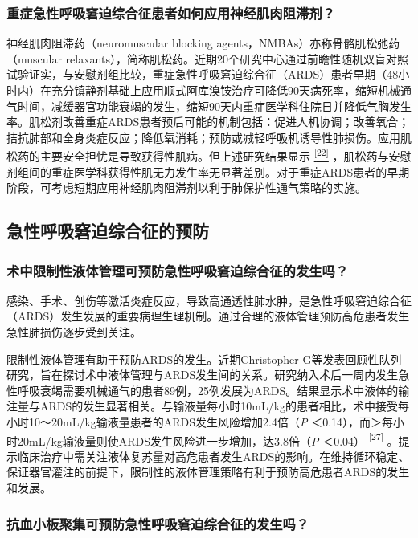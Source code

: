 \subsubsection{重症急性呼吸窘迫综合征患者如何应用神经肌肉阻滞剂？}

神经肌肉阻滞药（neuromuscular blocking
agents，NMBAs）亦称骨骼肌松弛药（muscular
relaxants），简称肌松药。近期20个研究中心通过前瞻性随机双盲对照试验证实，与安慰剂组比较，重症急性呼吸窘迫综合征（ARDS）患者早期（48小时内）在充分镇静剂基础上应用顺式阿库溴铵治疗可降低90天病死率，缩短机械通气时间，减缓器官功能衰竭的发生，缩短90天内重症医学科住院日并降低气胸发生率。肌松剂改善重症ARDS患者预后可能的机制包括：促进人机协调；改善氧合；拮抗肺部和全身炎症反应；降低氧消耗；预防或减轻呼吸机诱导性肺损伤。应用肌松药的主要安全担忧是导致获得性肌病。但上述研究结果显示
\protect\hyperlink{text00011.htmlux5cux23ch22-10}{\textsuperscript{{[}22{]}}}
，肌松药与安慰剂组间的重症医学科获得性肌无力发生率无显著差别。对于重症ARDS患者的早期阶段，可考虑短期应用神经肌肉阻滞剂以利于肺保护性通气策略的实施。

\subsection{急性呼吸窘迫综合征的预防}

\subsubsection{术中限制性液体管理可预防急性呼吸窘迫综合征的发生吗？}

感染、手术、创伤等激活炎症反应，导致高通透性肺水肿，是急性呼吸窘迫综合征（ARDS）发生发展的重要病理生理机制。通过合理的液体管理预防高危患者发生急性肺损伤逐步受到关注。

限制性液体管理有助于预防ARDS的发生。近期Christopher
G等发表回顾性队列研究，旨在探讨术中液体管理与ARDS发生间的关系。研究纳入术后一周内发生急性呼吸衰竭需要机械通气的患者89例，25例发展为ARDS。结果显示术中液体的输注量与ARDS的发生显著相关。与输液量每小时10mL/kg的患者相比，术中接受每小时10～20mL/kg输液量患者的ARDS发生风险增加2.4倍（\emph{P}
＜0.14），而＞每小时20mL/kg输液量则使ARDS发生风险进一步增加，达3.8倍（\emph{P}
＜0.04）
\protect\hyperlink{text00011.htmlux5cux23ch27-10}{\textsuperscript{{[}27{]}}}
。提示临床治疗中需关注液体复苏量对高危患者发生ARDS的影响。在维持循环稳定、保证器官灌注的前提下，限制性的液体管理策略有利于预防高危患者ARDS的发生和发展。

\subsubsection{抗血小板聚集可预防急性呼吸窘迫综合征的发生吗？}

